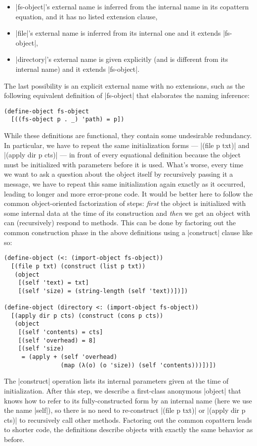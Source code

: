\begin{itemize}
\item \scm|fs-object|'s external name is inferred from the internal name in its copattern equation, and it has no listed extension clause,
\item \scm|file|'s external name is inferred from its internal one and it extends \scm|fs-object|,
\item \scm|directory|'s external name is given explicitly (and is different from its internal name) and it extends \scm|fs-object|.
\end{itemize}
The last possibility is an explicit external name with no extensions, such as the following equivalent definition of \scm|fs-object| that elaborates the naming inference:
\begin{verbatim}
(define-object fs-object
  [((fs-object p . _) 'path) = p])
\end{verbatim}

While these definitions are functional, they contain some undesirable redundancy.
In particular, we have to repeat the same initialization forms --- \scm|(file p txt)| and \scm|(apply dir p cts)| --- in front of every equational definition because the object must be initialized with parameters before it is used.
What's worse, every time we want to ask a question about the object itself by recursively passing it a message, we have to repeat this same initialization again exactly as it occurred, leading to longer and more error-prone code.
It would be better here to follow the common object-oriented factorization of steps:
\emph{first} the object is initialized with some internal data at the time of its construction and \emph{then} we get an object with can (recursively) respond to methods.
This can be done by factoring out the common construction phase in the above definitions using a \scm|construct| clause like so:
\begin{verbatim}
(define-object (<: (import-object fs-object))
  [(file p txt) (construct (list p txt))
   (object
    [(self 'text) = txt]
    [(self 'size) = (string-length (self 'text))])])

(define-object (directory <: (import-object fs-object))
  [(apply dir p cts) (construct (cons p cts))
   (object
    [(self 'contents) = cts]
    [(self 'overhead) = 8]
    [(self 'size)
     = (apply + (self 'overhead)
                (map (λ(o) (o 'size)) (self 'contents)))])])
\end{verbatim}
The \scm|construct| operation lists its internal parameters given at the time of
initialization.
After this step, we describe a first-class anonymous \scm|object| that knows
how to refer to its fully-constructed form by an internal name (here we use the
name \scm|self|), so there is no need to re-construct \scm|(file p txt)| or \scm|(apply dir p cts)| to recursively call other methods.
Factoring out the common copattern leads to shorter code, the definitions describe objects with exactly the same behavior as before.

